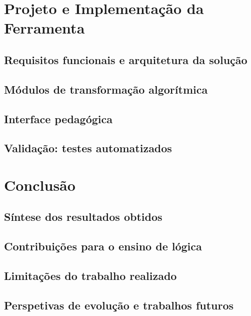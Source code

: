 \documentclass[12pt,a4paper,oneside]{report}
\theoremstyle{tituloplain}
\theoremstyle{titulodef}
\begin{document}
\chapter{Projeto e Implementação da Ferramenta}\label{cap:ferramenta}
\section{Requisitos funcionais e arquitetura da solução}\label{sec:requisitos}
\section{Módulos de transformação algorítmica}\label{sec:modulos}
\section{Interface pedagógica}\label{sec:interface}
\section{Validação: testes automatizados}\label{sec:validacao}

\chapter{Conclusão}\label{cap:conclusao}
\section{Síntese dos resultados obtidos}\label{sec:sintese}
\section{Contribuições para o ensino de lógica}\label{sec:contribuicoes}
\section{Limitações do trabalho realizado}\label{sec:limitacoes-trabalho}
\section{Perspetivas de evolução e trabalhos futuros}\label{sec:trabalhos-futuros}
\end{document}
